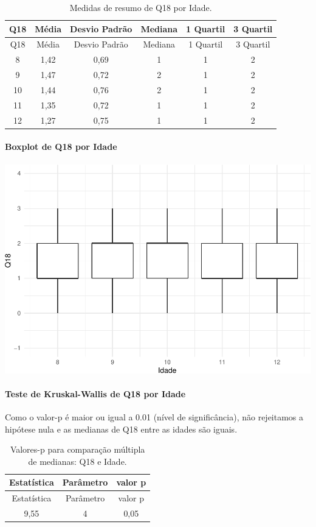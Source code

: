 \documentclass[]{article}
\let\oldparagraph\paragraph
\renewcommand{\paragraph}[1]{\oldparagraph{#1}\mbox{}}
\begin{document}
\begin{longtable}[]{@{}cccccc@{}}
\caption{\label{tab:unnamed-chunk-273}Medidas de resumo de Q18 por Idade.}\tabularnewline
\toprule
Q18 & Média & Desvio Padrão & Mediana & 1 Quartil & 3 Quartil\tabularnewline
\midrule
\endfirsthead
\toprule
Q18 & Média & Desvio Padrão & Mediana & 1 Quartil & 3 Quartil\tabularnewline
\midrule
\endhead
8 & 1,42 & 0,69 & 1 & 1 & 2\tabularnewline
9 & 1,47 & 0,72 & 2 & 1 & 2\tabularnewline
10 & 1,44 & 0,76 & 2 & 1 & 2\tabularnewline
11 & 1,35 & 0,72 & 1 & 1 & 2\tabularnewline
12 & 1,27 & 0,75 & 1 & 1 & 2\tabularnewline
\bottomrule
\end{longtable}

\hypertarget{boxplot-de-q18-por-idade}{%
\paragraph{Boxplot de Q18 por Idade}\label{boxplot-de-q18-por-idade}}

\begin{center}\includegraphics[width=0.75\linewidth]{relatorio_covid19_files/figure-latex/unnamed-chunk-274-1} \end{center}

\hypertarget{teste-de-kruskal-wallis-de-q18-por-idade}{%
\paragraph{Teste de Kruskal-Wallis de Q18 por Idade}\label{teste-de-kruskal-wallis-de-q18-por-idade}}

Como o valor-p é maior ou igual a 0.01 (nível de significância), não rejeitamos a hipótese nula e as medianas de Q18 entre as idades são iguais.

\begin{longtable}[]{@{}ccc@{}}
\caption{\label{tab:unnamed-chunk-276}Valores-p para comparação múltipla de medianas: Q18 e Idade.}\tabularnewline
\toprule
Estatística & Parâmetro & valor p\tabularnewline
\midrule
\endfirsthead
\toprule
Estatística & Parâmetro & valor p\tabularnewline
\midrule
\endhead
9,55 & 4 & 0,05\tabularnewline
\bottomrule
\end{longtable}
\end{document}
